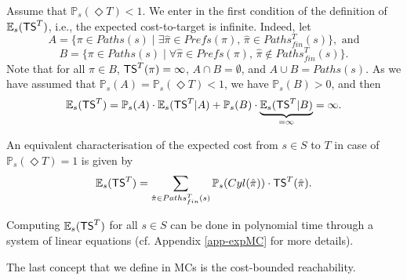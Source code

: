 \begin{remark}
Assume that $\mathbb{P}_s(\Diamond T) < 1$. We enter in the first condition of the definition of $\mathbb{E}_s(\text{\sffamily TS}^T)$, i.e., the expected cost-to-target is infinite. Indeed, let
\[A = \{\pi \in Paths(s) \; | \; \exists \hat{\pi} \in Prefs(\pi), \, \hat{\pi} \in Paths^T_{fin}(s)\}, \text{ and}\]
\[B=\{ \pi \in Paths(s) \; | \; \forall
\hat{\pi} \in Prefs(\pi), \, \hat{\pi} \not\in Paths^T_{fin}(s)\}.\]
Note that for all $\pi \in B$, $\text{\sffamily TS}^T(\pi) = \infty$,
$A \cap B = \emptyset$, and $A \cup B = Paths(s)$.
As we have assumed that $\mathbb{P}_s(A) = \mathbb{P}_s(\Diamond T) < 1$,
we have $\mathbb{P}_s(B) > 0$, and then
\[
  \mathbb{E}_s(\text{\sffamily TS}^T) = \mathbb{P}_s(A) \cdot \mathbb{E}_s(\text{\sffamily TS}^T | A) + \mathbb{P}_s(B) \cdot \underbrace{\mathbb{E}_s(\text{\sffamily TS}^T | B)}_{=\infty} = \infty.
\]
\end{remark}
\begin{remark}
An equivalent characterisation of the expected cost from $s \in S$ to $T$ in case of $\mathbb{P}_s(\Diamond T) = 1$ is given by
\[
  \mathbb{E}_s(\text{\sffamily TS}^T) = \sum_{\hat{\pi} \in Paths_{fin}^T(s)} \mathbb{P}_s(Cyl(\hat{\pi})) \cdot \text{\sffamily TS}^T(\hat{\pi}).
\]
\end{remark}

\begin{theorem}
  Computing $\mathbb{E}_s(\text{\sffamily TS}^T)$ for all $s \in S$ can be done in polynomial time through a system of linear equations (cf. Appendix \ref{app-expMC} for more details).
\end{theorem}

The last concept that we define in MCs is the cost-bounded reachability.

